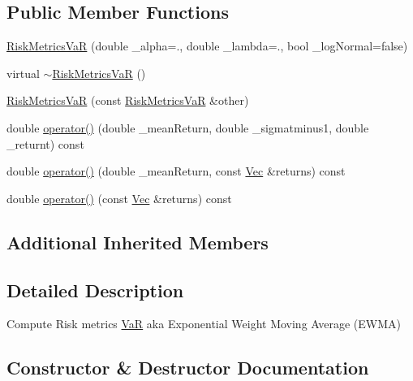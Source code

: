 \subsection*{Public Member Functions}
\begin{DoxyCompactItemize}
\item 
\hyperlink{classRiskMetricsVaR_a8e7cd1fce104f7b8ea679a81dbf680c0}{Risk\+Metrics\+VaR} (double \+\_\+alpha=., double \+\_\+lambda=., bool \+\_\+log\+Normal=false)
\item 
virtual \hyperlink{classRiskMetricsVaR_a97ad6e0fe38cfef62f10da67d542bdd0}{$\sim$\+Risk\+Metrics\+VaR} ()
\item 
\hyperlink{classRiskMetricsVaR_a296438226de45455204287f234034935}{Risk\+Metrics\+VaR} (const \hyperlink{classRiskMetricsVaR}{Risk\+Metrics\+VaR} \&other)
\item 
double \hyperlink{classRiskMetricsVaR_a801fc34d2327f8fffc1315a5a9aa9df1}{operator()} (double \+\_\+mean\+Return, double \+\_\+sigmatminus1, double \+\_\+returnt) const
\item 
double \hyperlink{classRiskMetricsVaR_ab83bde7047dc8e501b8e8ea115cf5e7b}{operator()} (double \+\_\+mean\+Return, const \hyperlink{compute__returns__eigen_8h_a1eb6a9306ef406d7975f3cbf2e247777}{Vec} \&returns) const
\item 
double \hyperlink{classRiskMetricsVaR_a3e79a82675a93c7467451146131a2ec5}{operator()} (const \hyperlink{compute__returns__eigen_8h_a1eb6a9306ef406d7975f3cbf2e247777}{Vec} \&returns) const
\end{DoxyCompactItemize}
\subsection*{Additional Inherited Members}


\subsection{Detailed Description}
Compute Risk metrics \hyperlink{classVaR}{VaR} aka Exponential Weight Moving Average (E\+W\+MA) 

\subsection{Constructor \& Destructor Documentation}
\hypertarget{classRiskMetricsVaR_a8e7cd1fce104f7b8ea679a81dbf680c0}{}\label{classRiskMetricsVaR_a8e7cd1fce104f7b8ea679a81dbf680c0} 
